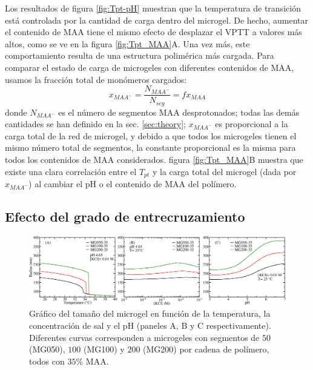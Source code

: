 Los resultados de figura \ref{fig:Tpt-pH} muestran que la temperatura de transici\'on est\'a controlada por la cantidad de carga dentro del microgel.
De hecho, aumentar el contenido de MAA tiene el mismo efecto de desplazar el VPTT a valores m\'as altos, como se ve en la figura \ref{fig:Tpt_MAA}A.
Una vez m\'as, este comportamiento resulta de una estructura polim\'erica m\'as cargada.
Para comparar el estado de carga de microgeles con diferentes contenidos de MAA, usamos la fracci\'on total de mon\'omeros cargados:
%
\begin{equation}
x_{MAA^-}=\frac{N_{MAA^-}}{N_{seg}}=f x_{MAA}
\end{equation}
%
\noindent donde $N_{MAA^-}$ es el n\'umero de segmentos MAA desprotonados; todas las dem\'as cantidades se han definido en la sec. \ref{sec:theory};
$x_{MAA^-}$ es proporcional a la carga total de la red de microgel, y
debido a que todos los microgeles tienen el mismo n\'umero total de segmentos, la constante proporcional es la misma para todos los contenidos de MAA considerados.
figura \ref{fig:Tpt_MAA}B muestra que existe una clara correlaci\'on entre el $T_{pt}$ y la carga total del microgel (dada por $x_{MAA^-}$) al cambiar el pH o el contenido de MAA del pol\'imero.

\subsection{Efecto del grado de entrecruzamiento}


\begin{figure}[!tb]
	\centering
	\includegraphics[width=1\linewidth]{Figures/graph-gel/R-all_xlink.png}
	\caption{Gr\'afico del tama\~no del microgel en funci\'on de la temperatura, la concentraci\'on de sal y el pH (paneles A, B y C respectivamente).
		Diferentes curvas corresponden a microgeles con segmentos de $50$ (MG050), $100$ (MG100) y $200$ (MG200) por cadena de pol\'imero, todos con $35\%$ MAA.}
	\label{fig:R_xlink}
\end{figure}


